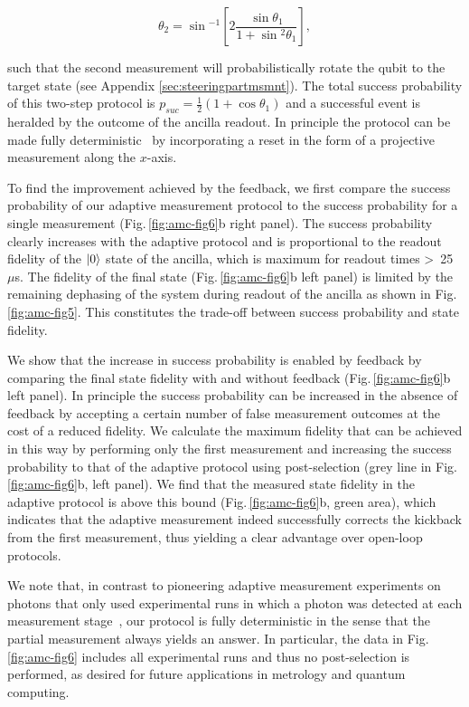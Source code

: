 \begin{equation}
\theta_2 = \sin{^{-1}\left[2 \frac{\sin{\theta_1}}{1 + \sin{^2 \theta_1}}\right]},
\end{equation}

such that the second measurement will probabilistically rotate the qubit to the target state (see Appendix \ref{sec:steeringpartmsmnt}). The total success probability of this two-step protocol is  $p_{suc} = \frac{1}{2}(1 + \cos{\theta_1})$ and a successful event is heralded by the outcome of the ancilla readout. In principle the protocol can be made fully deterministic~\cite{Ashhab_PhysRevA_2010} by incorporating a reset in the form of a projective measurement along the $x$-axis.

To find the improvement achieved by the feedback, we first compare the success probability of our adaptive measurement protocol to the success probability for a single measurement (Fig.\,\ref{fig:amc-fig6}b right panel). The success probability clearly increases with the adaptive protocol and is proportional to the readout fidelity of the $\left|0\right>$ state of the ancilla, which is maximum for readout times  \textgreater~25~$\mu$s. The fidelity of the final state (Fig.\,\ref{fig:amc-fig6}b left panel) is limited by the remaining dephasing of the system during readout of the ancilla as shown in Fig.\,\ref{fig:amc-fig5}. This constitutes the trade-off between success probability and state fidelity. 

We show that the increase in success probability is enabled by feedback by comparing the final state fidelity with and without feedback (Fig.\,\ref{fig:amc-fig6}b left panel). In principle the success probability can be increased in the absence of feedback by accepting a certain number of false measurement outcomes at the cost of a reduced fidelity. We calculate the maximum fidelity that can be achieved in this way by performing only the first measurement and increasing the success probability to that of the adaptive protocol using post-selection (grey line in Fig.\,\ref{fig:amc-fig6}b, left panel). We find that the measured state fidelity in the adaptive protocol is above this bound (Fig.\,\ref{fig:amc-fig6}b, green area), which indicates that the adaptive measurement indeed successfully corrects the kickback from the first measurement, thus yielding a clear advantage over open-loop protocols.



We note that, in contrast to pioneering adaptive measurement experiments on photons that only used experimental runs in which a photon was detected at each measurement stage~\cite{Prevedel_Nature_2007}, our protocol is fully deterministic in the sense that the partial measurement always yields an answer. In particular, the data in Fig.\,\ref{fig:amc-fig6} includes all experimental runs and thus no post-selection is performed, as desired for future applications in metrology and quantum computing. 

